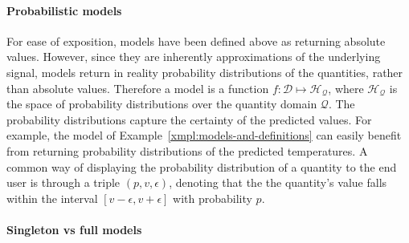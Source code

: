 \paragraph{Probabilistic models} For ease of exposition, models have been defined above as returning absolute values. However, since they are inherently approximations of the underlying signal, models return in reality probability distributions of the quantities, rather than absolute values. Therefore a model is a function $f:\mathcal{D}\mapsto \mathcal{H_{Q}}$, where $\mathcal{H_{Q}}$ is the space of probability distributions over the quantity domain $\mathcal{Q}$. The probability distributions capture the certainty of the predicted values. For example, the model of Example~\ref{xmpl:models-and-definitions} can easily benefit from returning probability distributions of the predicted temperatures. A common way of displaying the probability distribution of a quantity to the end user is through a triple $(p, v, \epsilon)$, denoting that the the quantity's value falls within the interval $[v - \epsilon, v + \epsilon]$ with probability $p$.\\

\paragraph{Singleton vs full models} 



